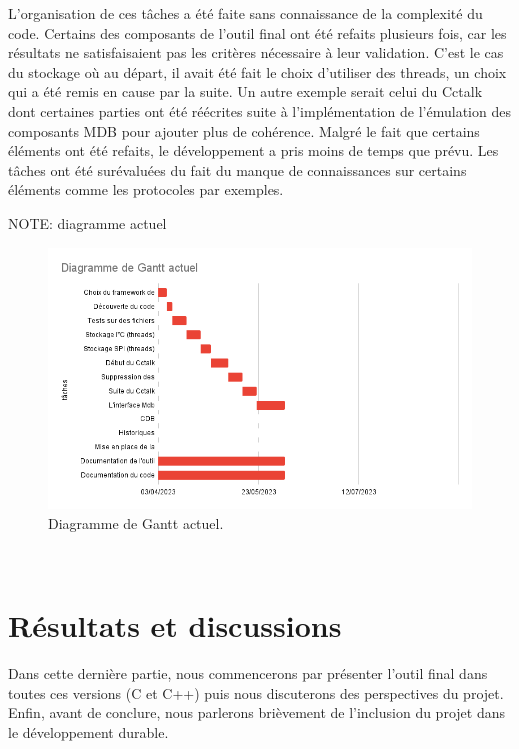 \documentclass[a4paper]{article}
\begin{document}
L'organisation de ces tâches a été faite sans connaissance de la complexité du
code. Certains des composants de l'outil final ont été refaits plusieurs fois, car
les résultats ne satisfaisaient pas les critères nécessaire à leur validation.
C'est le cas du stockage où au départ, il avait été fait le choix d'utiliser des
threads, un choix qui a été remis en cause par la suite. Un autre exemple serait
celui du Cctalk dont certaines parties ont été réécrites suite à
l'implémentation de l'émulation des composants MDB pour ajouter plus de
cohérence. Malgré le fait que certains éléments ont été refaits, le
développement a pris moins de temps que prévu. Les tâches ont été surévaluées du
fait du manque de connaissances sur certains éléments comme les protocoles par
exemples.

NOTE: diagramme actuel

\begin{figure}[h!]
  \begin{center}
  \includegraphics[scale=0.6]{./img/current-gantt.png}
  \caption{Diagramme de Gantt actuel.}
    \label{fig:finalgantt}
  \end{center}
\end{figure}~\\
\clearpage
\part{Résultats et discussions}

Dans cette dernière partie, nous commencerons par présenter l'outil final dans
toutes ces versions (C et C++) puis nous discuterons des perspectives du projet.
Enfin, avant de conclure, nous parlerons brièvement de l'inclusion du projet
dans le développement durable.
\end{document}
